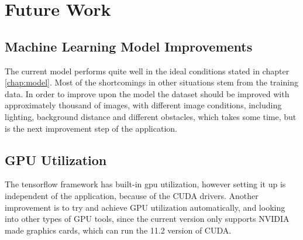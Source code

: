 \chapter{Future Work}
\label{chap:future}

\section{Machine Learning Model Improvements}
\label{sec:futuresec1}

\par The current model performs quite well in the ideal conditions stated in chapter \ref{chap:model}. Most of the shortcomings in other situations stem from the training data. In order to improve upon the model the dataset should be improved with approximately thousand of images, with different image conditions, including lighting, background distance and different obstacles, which takes some time, but is the next improvement step of the application.

\section{GPU Utilization}
\label{sec:futuresec2}

\par The tensorflow framework has built-in gpu utilization, however setting it up is independent of the application, because of the CUDA drivers. Another improvement is to try and achieve GPU utilization automatically, and looking into other types of GPU tools, since the current version only supports NVIDIA made graphics cards, which can run the 11.2 version of CUDA.